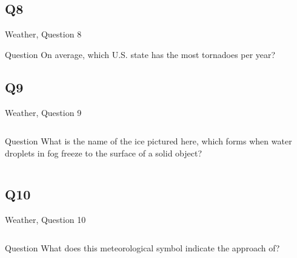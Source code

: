 \documentclass[11pt]{beamer}
\begin{document}
\subsection*{Q8}
\begin{frame}[t]{Weather, Question 8}
\begin{block}{Question}
On average, which U.S. state has the most tornadoes per year?
\end{block}
\end{frame}
\subsection*{Q9}
\begin{frame}[t]{Weather, Question 9}
\begin{columns}[T,totalwidth=\linewidth]
\begin{column}{0.32\linewidth}
\begin{block}{Question}
What is the name of the ice pictured here, which forms when water droplets in fog freeze to the surface of a solid object?
\end{block}
\end{column}
\begin{column}{0.65\linewidth}
\begin{center}
\texttt{[image: \{Images/rime]}.jpg}
\end{center}
\end{column}
\end{columns}
\end{frame}
\subsection*{Q10}
\begin{frame}[t]{Weather, Question 10}
\begin{columns}[T,totalwidth=\linewidth]
\begin{column}{0.32\linewidth}
\begin{block}{Question}
What does this meteorological symbol indicate the approach of?
\end{block}
\end{column}
\begin{column}{0.65\linewidth}
\begin{center}
\texttt{[image: \{Images/coldfront]}.png}
\end{center}
\end{column}
\end{columns}
\end{frame}
\end{document}
